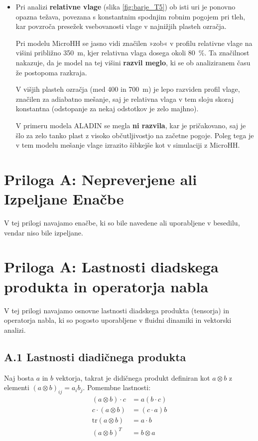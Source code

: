 \documentclass[mat2, tisk]{fmfdelo}
\begin{document}
\begin{itemize}
\item Pri analizi \textbf{relativne vlage} (slika \ref{fig:barje_T5}) ob isti uri je ponovno opazna težava, povezana s 
{konstantnim spodnjim robnim pogojem} pri tleh, kar povzroča 
{presežek vsebovanosti vlage v najnižjih plasteh ozračja}. 

Pri modelu {MicroHH} se jasno vidi značilen 
{»zob« v profilu relativne vlage} na višini približno {350~m}, 
kjer relativna vlaga dosega okoli {80~\%}. 
Ta značilnost nakazuje, da je model na tej višini \textbf{razvil meglo}, 
ki se ob analiziranem času že {postopoma razkraja}. 

V višjih plasteh ozračja (med {400 in 700~m}) je lepo razviden 
{profil vlage}, značilen za {adiabatno mešanje}, 
saj je {relativna vlaga v tem sloju skoraj konstantna} (odstopanje za nekaj odstotkov je zelo majhno). 

V primeru modela {ALADIN} 
se megla \textbf{ni razvila}, kar je pričakovano, saj je šlo za {zelo tanko plast} 
z visoko občutljivostjo na začetne pogoje. 
Poleg tega je v tem modelu {mešanje vlage izrazito šibkejše} kot v simulaciji z MicroHH. 
\end{itemize}


\newpage
\appendix
\section*{Priloga A: Nepreverjene ali Izpeljane Enačbe}

V tej prilogi navajamo enačbe, ki so bile navedene ali uporabljene v besedilu, 
vendar niso bile izpeljane.

\section*{Priloga A: Lastnosti diadskega produkta in operatorja nabla}

V tej prilogi navajamo osnovne lastnosti diadskega produkta (tensorja) in operatorja nabla, ki so pogosto uporabljene v fluidni dinamiki in vektorski analizi.

\subsection*{A.1 Lastnosti diadičnega produkta}
Naj bosta \(a\) in \(b\) vektorja, takrat je didičnega produkt definiran kot \(a \otimes b\) z elementi \((a \otimes b)_{ij} = a_i b_j\).  
Pomembne lastnosti:
\begin{align}
(a \otimes b) \cdot c &= a (b \cdot c) \\
c \cdot (a \otimes b) &= (c \cdot a) b \\
\text{tr}(a \otimes b) &= a \cdot b \\
(a \otimes b)^T &= b \otimes a
\end{align}
\end{document}

